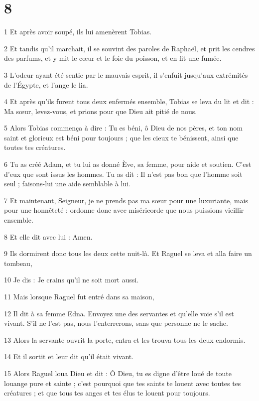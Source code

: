 \chapter{8}

\par 1 Et après avoir soupé, ils lui amenèrent Tobias.
\par 2 Et tandis qu'il marchait, il se souvint des paroles de Raphaël, et prit les cendres des parfums, et y mit le cœur et le foie du poisson, et en fit une fumée.
\par 3 L'odeur ayant été sentie par le mauvais esprit, il s'enfuit jusqu'aux extrémités de l'Égypte, et l'ange le lia.
\par 4 Et après qu'ils furent tous deux enfermés ensemble, Tobias se leva du lit et dit : Ma sœur, levez-vous, et prions pour que Dieu ait pitié de nous.
\par 5 Alors Tobias commença à dire : Tu es béni, ô Dieu de nos pères, et ton nom saint et glorieux est béni pour toujours ; que les cieux te bénissent, ainsi que toutes tes créatures.
\par 6 Tu as créé Adam, et tu lui as donné Ève, sa femme, pour aide et soutien. C'est d'eux que sont issus les hommes. Tu as dit : Il n'est pas bon que l'homme soit seul ; faisons-lui une aide semblable à lui.
\par 7 Et maintenant, Seigneur, je ne prends pas ma sœur pour une luxuriante, mais pour une honnêteté : ordonne donc avec miséricorde que nous puissions vieillir ensemble.
\par 8 Et elle dit avec lui : Amen.
\par 9 Ils dormirent donc tous les deux cette nuit-là. Et Raguel se leva et alla faire un tombeau,
\par 10 Je dis : Je crains qu'il ne soit mort aussi.
\par 11 Mais lorsque Raguel fut entré dans sa maison,
\par 12 Il dit à sa femme Edna. Envoyez une des servantes et qu'elle voie s'il est vivant. S'il ne l'est pas, nous l'enterrerons, sans que personne ne le sache.
\par 13 Alors la servante ouvrit la porte, entra et les trouva tous les deux endormis.
\par 14 Et il sortit et leur dit qu'il était vivant.
\par 15 Alors Raguel loua Dieu et dit : Ô Dieu, tu es digne d'être loué de toute louange pure et sainte ; c'est pourquoi que tes saints te louent avec toutes tes créatures ; et que tous tes anges et tes élus te louent pour toujours.
